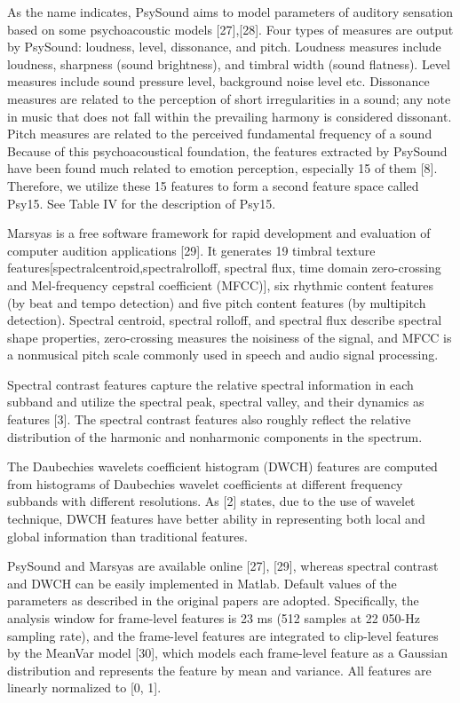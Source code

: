 \documentclass[journal, twoside]{IEEEtran}
\begin{document}
As the name indicates, PsySound aims to model parameters of auditory sensation based on some psychoacoustic models [27],[28]. Four types of measures are output by PsySound: loudness, level, dissonance, and pitch. Loudness measures include loudness, sharpness (sound brightness), and timbral width (sound flatness). Level measures include sound pressure level, background noise level etc. Dissonance measures are related to the perception of short irregularities in a sound; any note in music that does not fall within the prevailing harmony is considered dissonant. Pitch measures are related to the perceived fundamental frequency of a sound  Because of this psychoacoustical foundation, the features extracted by PsySound have been found much related to emotion perception, especially 15 of them [8]. Therefore, we utilize these 15 features to form a second feature space called Psy15. See Table IV for the description of Psy15.

Marsyas is a free software framework for rapid development and evaluation of computer audition applications [29]. It generates 19 timbral texture features[spectralcentroid,spectralrolloff, spectral flux, time domain zero-crossing and Mel-frequency cepstral coefficient (MFCC)], six rhythmic content features (by beat and tempo detection) and five pitch content features (by multipitch detection). Spectral centroid, spectral rolloff, and spectral flux describe spectral shape properties, zero-crossing measures the noisiness of the signal, and MFCC is a nonmusical pitch scale commonly used in speech and audio signal processing.

Spectral contrast features capture the relative spectral information in each subband and utilize the spectral peak, spectral valley, and their dynamics as features [3]. The spectral contrast features also roughly reflect the relative distribution of the harmonic and nonharmonic components in the spectrum.

The Daubechies wavelets coefficient histogram (DWCH) features are computed from histograms of Daubechies wavelet coefficients at different frequency subbands with different resolutions. As [2] states, due to the use of wavelet technique, DWCH features have better ability in representing both local and global information than traditional features.

PsySound and Marsyas are available online [27], [29], whereas spectral contrast and DWCH can be easily implemented in Matlab. Default values of the parameters as described in the original papers are adopted. Specifically, the analysis window for frame-level features is 23 ms (512 samples at 22 050-Hz sampling rate), and the frame-level features are
integrated to clip-level features by the MeanVar model [30], which models each frame-level feature as a Gaussian distribution and represents the feature by mean and variance. All features are linearly normalized to [0, 1].
\end{document}

